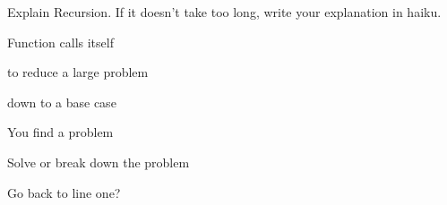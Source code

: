 \begin{blocksection}
\question Explain Recursion. If it doesn't take too long, write your explanation in haiku.

\medskip

\begin{minipage}{0.5\linewidth}
Function calls itself

to reduce a large problem

down to a base case
\end{minipage}
\begin{minipage}{0.5\textwidth}
You find a problem

Solve or break down the problem

Go back to line one?
\end{minipage}
\end{blocksection}
